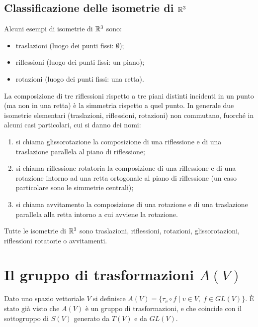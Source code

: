   \subsection{Classificazione delle isometrie di $\mathbb R^3$}
  
 Alcuni esempi di isometrie di $\mathbb R^3$ sono:
 \begin{itemize}
  \item traslazioni (luogo dei punti fissi: $\emptyset$);
  \item riflessioni (luogo dei punti fissi: un piano);
  \item rotazioni (luogo dei punti fissi: una retta).
 \end{itemize}
 \begin{remark}
 La composizione di tre riflessioni rispetto a tre piani distinti incidenti in un punto (ma non in una retta)
 è la simmetria rispetto a quel punto.
 In generale due isometrie elementari (traslazioni, riflessioni, rotazioni) non commutano, fuorché in alcuni casi particolari,
 cui si danno dei nomi:
 \begin{enumerate}[label=\bf\Roman*)]
  \item  si chiama glissorotazione la composizione di una riflessione e di una traslazione parallela al piano di riflessione;
  \item si chiama riflessione rotatoria la composizione di una riflessione e di una rotazione intorno ad una retta ortogonale
  al piano di riflessione (un caso particolare sono le simmetrie centrali);
  \item si chiama avvitamento la composizione di una rotazione e di una traslazione parallela alla retta intorno a cui
  avviene la rotazione.
 \end{enumerate}
 \end{remark}
 \begin{theorem}
 Tutte le isometrie di $\mathbb R^3$ sono traslazioni, riflessioni, rotazioni, glissorotazioni, riflessioni rotatorie
 o avvitamenti.
 \end{theorem}
 
  \section{Il gruppo di trasformazioni $A(V)$}
 Dato uno spazio vettoriale $V$ si definisce $A(V)=\{\tau_v\circ f\;|\; v\in V,\; f\in GL(V)\}$.
 È stato già visto che $A(V)$ è un gruppo di trasformazioni, e che coincide con il sottogruppo di $S(V)$
 generato da $T(V)$ e da $GL(V)$.
 

